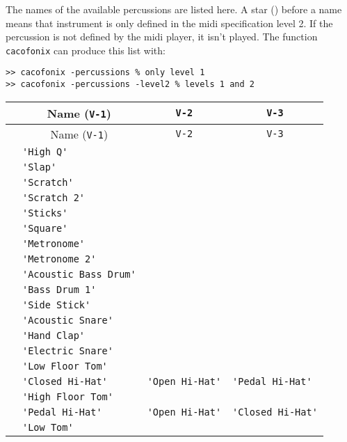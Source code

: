 \documentclass{article}
\newcommand\lvlo{}
\newcommand\lvlt{\ding{105}}
\begin{document}
The names of the available percussions are listed here. A star (\lvlt) before a name means that instrument is only defined in the midi specification level 2. If the percussion is not defined by the midi player, it isn't played. The function \lstinline!cacofonix! can produce this list with:
\begin{lstlisting}
>> cacofonix -percussions % only level 1
>> cacofonix -percussions -level2 % levels 1 and 2
\end{lstlisting}

\begin{center}
\begin{longtable}{llll}
	& \multicolumn{1}{c}{Name (\lstinline!V-1!)} & \multicolumn{1}{c}{\lstinline!V-2!} & \multicolumn{1}{c}{\lstinline!V-3!} \\
\endfirsthead
	& \multicolumn{1}{c}{Name (\lstinline!V-1!)} & \multicolumn{1}{c}{\lstinline!V-2!} & \multicolumn{1}{c}{\lstinline!V-3!} \\
\endhead
 \lvlt & \lstinline!'High Q'! & & \\
 \lvlt & \lstinline!'Slap'! & & \\
 \lvlt & \lstinline!'Scratch'! & & \\
 \lvlt & \lstinline!'Scratch 2'! & & \\
 \lvlt & \lstinline!'Sticks'! & & \\
 \lvlt & \lstinline!'Square'! & & \\
 \lvlt & \lstinline!'Metronome'! & & \\
 \lvlt & \lstinline!'Metronome 2'! & & \\
 \lvlo & \lstinline!'Acoustic Bass Drum'! & & \\
 \lvlo & \lstinline!'Bass Drum 1'! & & \\
 \lvlo & \lstinline!'Side Stick'! & & \\
 \lvlo & \lstinline!'Acoustic Snare'! & & \\
 \lvlo & \lstinline!'Hand Clap'! & & \\
 \lvlo & \lstinline!'Electric Snare'! & & \\
 \lvlo & \lstinline!'Low Floor Tom'! & & \\
 \lvlo & \lstinline!'Closed Hi-Hat'! & \lstinline!'Open Hi-Hat'! & \lstinline!'Pedal Hi-Hat'! \\
 \lvlo & \lstinline!'High Floor Tom'! & & \\
 \lvlo & \lstinline!'Pedal Hi-Hat'! & \lstinline!'Open Hi-Hat'! & \lstinline!'Closed Hi-Hat'! \\
 \lvlo & \lstinline!'Low Tom'! & & \\

\end{longtable}
\end{center}
\end{document}
